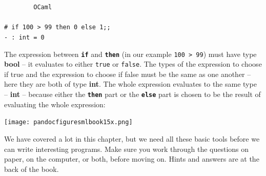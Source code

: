 \documentclass[]{book}
\newcommand{\smspace}{\vspace{4mm}}
\begin{document}
\smspace
\noindent\verb!        OCaml!\\
\noindent\\
\noindent\texttt{\# if 100 > 99 then 0 else 1;;}\\
\noindent\texttt{- :\ int = 0} 
\smspace

\noindent The expression between \textbf{\texttt{if}} and \textbf{\texttt{then}} (in our example \texttt{100 > 99}) must have type \textbf{\textsf{bool}} -- it evaluates to either \texttt{true} or \texttt{false}. The types of the expression to choose if true and the expression to choose if false must be the same as one another -- here they are both of type \textbf{\textsf{int}}. The whole expression evaluates to the same type -- \textbf{\textsf{int}} -- because either the \textbf{\texttt{then}} part or the \textbf{\texttt{else}} part is chosen to be the result of evaluating the whole expression:

\medskip
\begin{center}
\noindent\texttt{[image: pandocfiguresmlbook15x.png]}
\end{center}
\medskip

\noindent We have covered a lot in this chapter, but we need all these basic tools before we can write interesting programs. Make sure you work through the questions on paper, on the computer, or both, before moving on. Hints and answers are at the back of the book.

\clearpage
\end{document}
